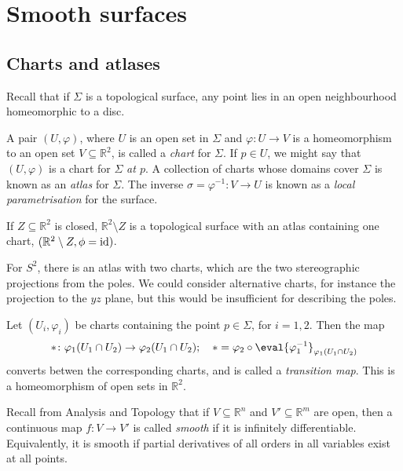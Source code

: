 \section{Smooth surfaces}

\subsection{Charts and atlases}
Recall that if $\Sigma$ is a topological surface, any point lies in an open neighbourhood homeomorphic to a disc.
\begin{definition}
	A pair $(U, \varphi)$, where $U$ is an open set in $\Sigma$ and $\varphi \colon U \to V$ is a homeomorphism to an open set $V \subseteq \mathbb R^2$, is called a \textit{chart} for $\Sigma$.
	If $p \in U$, we might say that $(U, \varphi)$ is a chart for $\Sigma$ \textit{at $p$}.
	A collection of charts whose domains cover $\Sigma$ is known as an \textit{atlas} for $\Sigma$.
	The inverse $\sigma = \varphi^{-1} \colon V \to U$ is known as a \textit{local parametrisation} for the surface.
\end{definition}
\begin{example}
	If $Z \subseteq \mathbb R^2$ is closed, $\mathbb R^2 \setminus Z$ is a topological surface with an atlas containing one chart, $(\mathbb R^2 \setminus Z, \phi = \operatorname{id})$.

	For $S^2$, there is an atlas with two charts, which are the two stereographic projections from the poles.
	We could consider alternative charts, for instance the projection to the $yz$ plane, but this would be insufficient for describing the poles.
\end{example}
\begin{definition}
	Let $(U_i, \varphi_i)$ be charts containing the point $p \in \Sigma$, for $i = 1, 2$.
	Then the map
	\begin{align*}
		\ast \colon \varphi_1(U_1 \cap U_2) \to \varphi_2(U_1 \cap U_2);\quad \ast = \varphi_2 \circ \eval{\varphi_1^{-1}}_{\varphi_1(U_1 \cap U_2)}
	\end{align*}
	converts betwen the corresponding charts, and is called a \textit{transition map}.
	This is a homeomorphism of open sets in $\mathbb R^2$.
\end{definition}
Recall from Analysis and Topology that if $V \subseteq \mathbb R^n$ and $V' \subseteq \mathbb R^m$ are open, then a continuous map $f \colon V \to V'$ is called \textit{smooth} if it is infinitely differentiable.
Equivalently, it is smooth if partial derivatives of all orders in all variables exist at all points.
